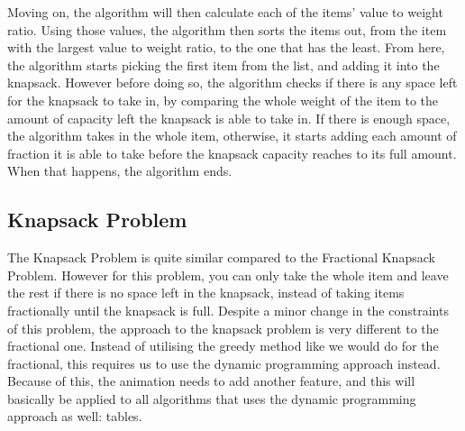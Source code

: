 Moving on, the algorithm will then calculate each of the items' value to weight ratio. Using those values, the algorithm then sorts the items out, from the item with the largest value to weight ratio, to the one that has the least. From here, the algorithm starts picking the first item from the list, and adding it into the knapsack. However before doing so, the algorithm checks if there is any space left for the knapsack to take in, by comparing the whole weight of the item to the amount of capacity left the knapsack is able to take in. If there is enough space, the algorithm takes in the whole item, otherwise, it starts adding each amount of fraction it is able to take before the knapsack capacity reaches to its full amount. When that happens, the algorithm ends.

\subsection{Knapsack Problem}

The Knapsack Problem is quite similar compared to the Fractional Knapsack Problem. However for this problem, you can only take the whole item and leave the rest if there is no space left in the knapsack, instead of taking items fractionally until the knapsack is full. Despite a minor change in the constraints of this problem, the approach to the knapsack problem is very different to the fractional one. Instead of utilising the greedy method like we would do for the fractional, this requires us to use the dynamic programming approach instead. Because of this, the animation needs to add another feature, and this will basically be applied to all algorithms that uses the dynamic programming approach as well: tables.

